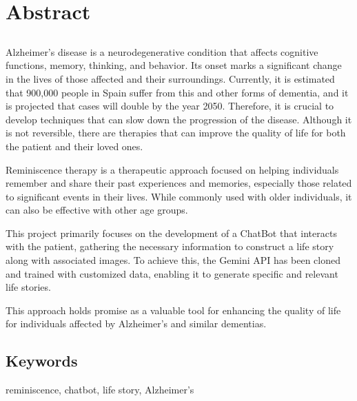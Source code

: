 \chapter*{Abstract}

\section*{\tituloPortadaEngVal}

Alzheimer's disease is a neurodegenerative condition that affects cognitive functions, memory, thinking, and behavior. Its onset marks a significant change in the lives of those affected and their surroundings. Currently, it is estimated that 900,000 people in Spain suffer from this and other forms of dementia, and it is projected that cases will double by the year 2050. Therefore, it is crucial to develop techniques that can slow down the progression of the disease. Although it is not reversible, there are therapies that can improve the quality of life for both the patient and their loved ones.

Reminiscence therapy is a therapeutic approach focused on helping individuals remember and share their past experiences and memories, especially those related to significant events in their lives. While commonly used with older individuals, it can also be effective with other age groups.

This project primarily focuses on the development of a ChatBot that interacts with the patient, gathering the necessary information to construct a life story along with associated images. To achieve this, the Gemini API has been cloned and trained with customized data, enabling it to generate specific and relevant life stories.

This approach holds promise as a valuable tool for enhancing the quality of life for individuals affected by Alzheimer's and similar dementias. 
\section*{Keywords}

\noindent reminiscence, chatbot, life story, Alzheimer's



